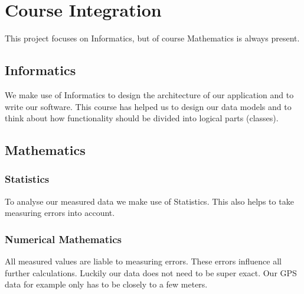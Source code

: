 \section{Course Integration}
This project focuses on Informatics, but of course Mathematics is always present.
\subsection{Informatics}
We make use of Informatics to design the architecture of our application and to write our
software. This course has helped us to design our data models and to think about how
functionality should be divided into logical parts (classes).
\subsection{Mathematics}
\subsubsection{Statistics}
To analyse our measured data we make use of Statistics. This also helps to take
measuring errors into account.
\subsubsection{Numerical Mathematics}
All measured values are liable to measuring errors. These errors influence all further
calculations. Luckily our data does not need to be super exact. Our GPS data for example
only has to be closely to a few meters.